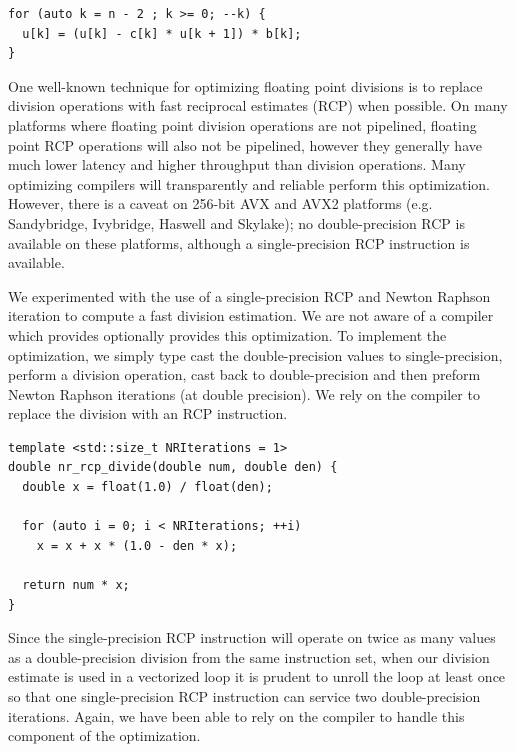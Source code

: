 \documentclass[conference]{IEEEtran}
\begin{document}
\begin{lstlisting}
for (auto k = n - 2 ; k >= 0; --k) {
  u[k] = (u[k] - c[k] * u[k + 1]) * b[k];
} 
\end{lstlisting}


One well-known technique for optimizing floating point divisions is to replace
division operations with fast reciprocal estimates (RCP) when possible. On many
platforms where floating point division operations are not pipelined, floating
point RCP operations will also not be pipelined, however they generally have
much lower latency and higher throughput than division operations. Many
optimizing compilers will transparently and reliable perform this optimization.
However, there is a caveat on 256-bit AVX and AVX2 platforms (e.g. Sandybridge,
Ivybridge, Haswell and Skylake); no double-precision RCP is available on these
platforms, although a single-precision RCP instruction is available.


We experimented with the use of a single-precision RCP and Newton Raphson
iteration to compute a fast division estimation. We are not aware of a compiler
which provides optionally provides this optimization. To implement the
optimization, we simply type cast the double-precision values to
single-precision, perform a division operation, cast back to double-precision
and then preform Newton Raphson iterations (at double precision). We rely on
the compiler to replace the division with an RCP instruction.

\begin{lstlisting}
template <std::size_t NRIterations = 1>
double nr_rcp_divide(double num, double den) {
  double x = float(1.0) / float(den);

  for (auto i = 0; i < NRIterations; ++i)
    x = x + x * (1.0 - den * x);

  return num * x;
}
\end{lstlisting}

Since the single-precision RCP instruction will operate on twice as many values
as a double-precision division from the same instruction set, when our division
estimate is used in a vectorized loop it is prudent to unroll the loop at least
once so that one single-precision RCP instruction can service two
double-precision iterations. Again, we have been able to rely on the compiler
to handle this component of the optimization.
\end{document}
